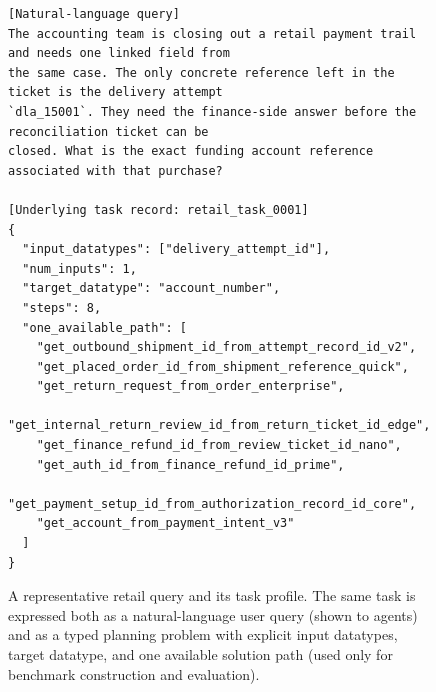 \begin{figure}[htbp]
\begin{tcolorbox}[
    colback=black!5!white,
    colframe=black,
    title=Data Case: Representative Query and Task Profile,
    fonttitle=\bfseries,
    colbacktitle=black!20!white,
    coltitle=black,
    boxrule=1.5pt,
    arc=5pt,
    boxsep=5pt,
    left=12pt,
    right=12pt,
    top=12pt,
    bottom=12pt
]
\begin{lstlisting}[basicstyle=\ttfamily\footnotesize,breaklines=true,columns=fullflexible,keepspaces=true]
[Natural-language query]
The accounting team is closing out a retail payment trail and needs one linked field from
the same case. The only concrete reference left in the ticket is the delivery attempt
`dla_15001`. They need the finance-side answer before the reconciliation ticket can be
closed. What is the exact funding account reference associated with that purchase?

[Underlying task record: retail_task_0001]
{
  "input_datatypes": ["delivery_attempt_id"],
  "num_inputs": 1,
  "target_datatype": "account_number",
  "steps": 8,
  "one_available_path": [
    "get_outbound_shipment_id_from_attempt_record_id_v2",
    "get_placed_order_id_from_shipment_reference_quick",
    "get_return_request_from_order_enterprise",
    "get_internal_return_review_id_from_return_ticket_id_edge",
    "get_finance_refund_id_from_review_ticket_id_nano",
    "get_auth_id_from_finance_refund_id_prime",
    "get_payment_setup_id_from_authorization_record_id_core",
    "get_account_from_payment_intent_v3"
  ]
}
\end{lstlisting}
\end{tcolorbox}
\caption{A representative retail query and its task profile. The same task is expressed both as a natural-language user query (shown to agents) and as a typed planning problem with explicit input datatypes, target datatype, and one available solution path (used only for benchmark construction and evaluation).}
\label{fig:case_data_query_profile}
\end{figure}

\clearpage
\onecolumn

